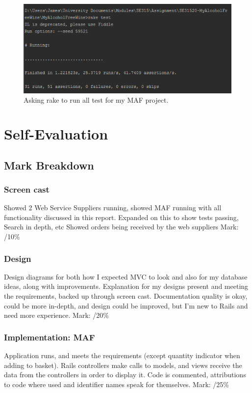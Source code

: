 \documentclass[12pt]{article}
\begin{document}
\begin{figure}[H]
        \centering
                \includegraphics[width=1\textwidth]{assets/unit_test}
                \caption{Asking rake to run all test for my MAF project.}
                \label{fig: running tests.} 
\end{figure}


\section{Self-Evaluation}
\subsection{Mark Breakdown}
\subsubsection{Screen cast}
Showed 2 Web Service Suppliers running, showed MAF running with all functionality discussed in this report. Expanded on this to show tests passing, Search in depth, etc Showed orders being received by the web suppliers
Mark: /10\%

\subsubsection{Design}
Design diagrams for both how I expected MVC to look and also for my database ideas, along with improvements. Explanation for my designs present and meeting the requirements, backed up through screen cast. Documentation quality is okay, could be more in-depth, and design could be improved, but I'm new to Rails and need more experience.
Mark: /20\%

\subsubsection{Implementation: MAF}
Application runs, and meets the requirements (except quantity indicator when adding to basket). Rails controllers make calls to models, and views receive the data from the controllers in order to display it. Code is commented, attributions to code where used and identifier names speak for themselves.
Mark: /25\%
\end{document}
